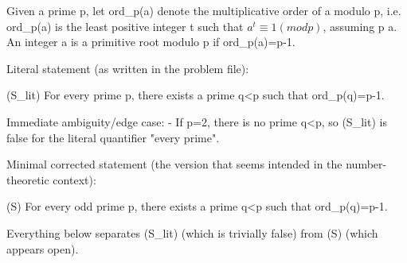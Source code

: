 Given a prime p, let ord_p(a) denote the multiplicative order of a modulo p, i.e.
ord_p(a) is the least positive integer t such that \(a^t \equiv 1 (mod p)\), assuming p \nmid a.
An integer a is a primitive root modulo p if ord_p(a)=p-1.

Literal statement (as written in the problem file):

  (S_lit)  For every prime p, there exists a prime q<p such that ord_p(q)=p-1.

Immediate ambiguity/edge case:
- If p=2, there is no prime q<p, so (S_lit) is false for the literal quantifier "every prime".

Minimal corrected statement (the version that seems intended in the number-theoretic context):

  (S)  For every odd prime p, there exists a prime q<p such that ord_p(q)=p-1.

Everything below separates (S_lit) (which is trivially false) from (S) (which appears open).
